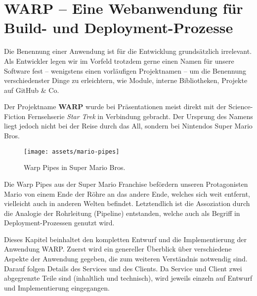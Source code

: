 
\chapter{WARP – Eine Webanwendung für Build- und Deployment-Prozesse}

Die Benennung einer Anwendung ist für die Entwicklung grundsätzlich irrelevant. Als Entwickler legen wir im Vorfeld trotzdem gerne einen Namen für unsere Software fest – wenigstens einen vorläufigen Projektnamen – um die Benennung verschiedenster Dinge zu erleichtern, wie Module, interne Bibliotheken, Projekte auf GitHub \& Co.

Der Projektname \textbf{WARP} wurde bei Präsentationen meist direkt mit der Science-Fiction Fernsehserie \emph{Star Trek} in Verbindung gebracht. Der Ursprung des Namens liegt jedoch nicht bei der Reise durch das All, sondern bei Nintendos Super Mario Bros.

\begin{figure}[h]
  \caption{Warp Pipes in Super Mario Bros.}
  \label{fig:super-mario-warp-pipes}
  \centering
    \texttt{[image: assets/mario-pipes]}
\end{figure}

Die Warp Pipes aus der Super Mario Franchise befördern unseren Pro\-ta\-go\-nisten Mario von einem Ende der Röhre an das andere Ende, welches sich weit entfernt, vielleicht auch in anderen Welten befindet. Letztendlich ist die Assoziation durch die Analogie der Rohrleitung (Pipeline) entstanden, welche auch als Begriff in Deployment-Prozessen genutzt wird.

Dieses Kapitel beinhaltet den kompletten Entwurf und die Implementierung der Anwendung WARP. Zuerst wird ein genereller Überblick über verschiedene Aspekte der Anwendung gegeben, die zum weiteren Verständnis notwendig sind. Darauf folgen Details des Services und des Clients. Da Service und Client zwei abgegrenzte Teile sind (inhaltlich und technisch), wird jeweils einzeln auf Entwurf und Implementierung eingegangen.

